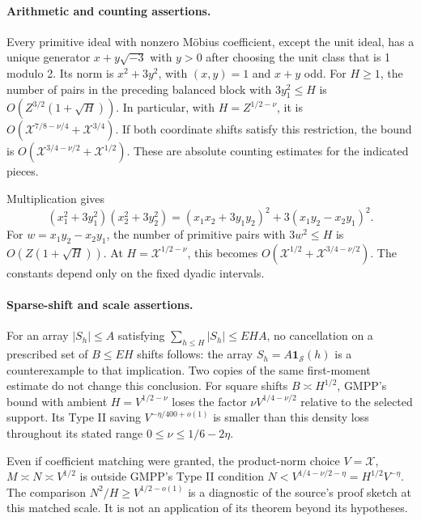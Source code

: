 \documentclass[11pt]{article}
\begin{document}
\paragraph{Arithmetic and counting assertions.}
Every primitive ideal with nonzero Möbius coefficient, except the
unit ideal, has a unique generator \(x+y\sqrt{-3}\) with \(y>0\)
after choosing the unit class that is 1 modulo 2. Its norm is
\(x^2+3y^2\), with \((x,y)=1\) and \(x+y\) odd.
For \(H\ge1\), the number of pairs in the preceding balanced block
with \(3y_1^2\le H\) is \(O(Z^{3/2}(1+\sqrt H))\).
In particular, with \(H=Z^{1/2-\nu}\), it is
\(O(\mathcal X^{7/8-\nu/4}+\mathcal X^{3/4})\).
If both coordinate shifts satisfy this restriction, the bound is
\(O(\mathcal X^{3/4-\nu/2}+\mathcal X^{1/2})\).
These are absolute counting estimates for the indicated pieces.

Multiplication gives
\[
 (x_1^2+3y_1^2)(x_2^2+3y_2^2)
 =(x_1x_2+3y_1y_2)^2+3(x_1y_2-x_2y_1)^2.
\]
For \(w=x_1y_2-x_2y_1\), the number of primitive pairs with
\(3w^2\le H\) is \(O(Z(1+\sqrt H))\).
At \(H=\mathcal X^{1/2-\nu}\), this becomes
\(O(\mathcal X^{1/2}+\mathcal X^{3/4-\nu/2})\).
The constants depend only on the fixed dyadic intervals.

\paragraph{Sparse-shift and scale assertions.}
For an array \(|S_h|\le A\) satisfying
\(\sum_{h\le H}|S_h|\le EHA\), no cancellation on a prescribed
set of \(B\le EH\) shifts follows: the array
\(S_h=A\mathbf1_{\mathcal S}(h)\) is a counterexample to that
implication. Two copies of the same first-moment estimate do
not change this conclusion. For square shifts \(B\asymp H^{1/2}\),
GMPP's bound with ambient \(H=V^{1/2-\nu}\) loses the factor
\(\nu V^{1/4-\nu/2}\) relative to the selected support.
Its Type II saving \(V^{-\eta/400+o(1)}\) is smaller than this
density loss throughout its stated range
\(0\le\nu\le1/6-2\eta\).

Even if coefficient matching were granted, the product-norm
choice \(V=\mathcal X\), \(M\asymp N\asymp V^{1/2}\) is outside
GMPP's Type II condition
\(N<V^{1/4-\nu/2-\eta}=H^{1/2}V^{-\eta}\).
The comparison \(N^2/H\ge V^{1/2-o(1)}\) is a diagnostic of
the source's proof sketch at this matched scale. It is not an
application of its theorem beyond its hypotheses.
\end{document}
